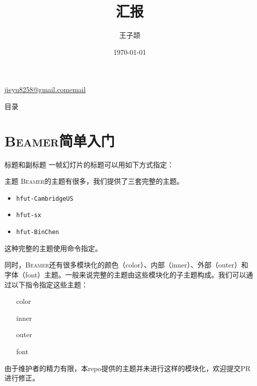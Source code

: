 \documentclass[aspectratio=169]{beamer}
\title{汇报}
\author{王子颉}
\institute{School of Computer and Informatics, HFUT}
\date{\today}
\makeatletter
\newcommand{\Beamer}{\textsc{Beamer}}
\newcommand{\enableindent}{\setlength{\parskip}{6pt}\setlength{\parindent}{2em}}
\newcommand{\contactinfo}{
  \begin{center}
    \href{mailto:jieyu8258@gmail.com}{jieyu8258@gmail.comemail}
  \end{center}
}
\makeatother
\begin{document}
\begin{frame}
	\maketitle
	\contactinfo
\end{frame}

\begin{frame}{目录}
	\tableofcontents
\end{frame}

\section{\Beamer{}简单入门}

\begin{frame}[fragile]{标题}{和副标题}
一帧幻灯片的标题可以用如下方式指定：

\end{frame}

\begin{frame}{主题}
	\enableindent
	\Beamer 的主题有很多，我们提供了三套完整的主题。
	\begin{itemize}
		\item \texttt{hfut-CambridgeUS}
		\item \texttt{hfut-sx}
		\item \texttt{hfut-BinChen}
	\end{itemize}

	这种完整的主题使用\texttt{\usetheme}命令指定。

	\framebreak

	同时，\Beamer 还有很多模块化的颜色（color）、内部（inner）、外部（outer）和字体（font）主题。一般来说完整的主题由这些模块化的子主题构成。我们可以通过以下指令指定这些主题：
	\begin{itemize}
		\item[color] \texttt{\usecolortheme}
		\item[inner] \texttt{\useinnertheme}
		\item[outer] \texttt{\useoutertheme}
		\item[font] \texttt{\usefonttheme}
	\end{itemize}

	由于维护者的精力有限，本repo提供的主题并未进行这样的模块化，欢迎提交PR进行修正。

\end{frame}
\end{document}
